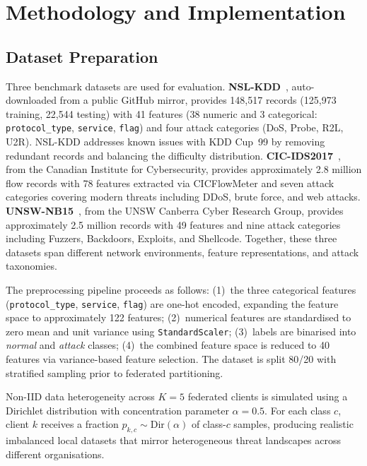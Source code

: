 \documentclass[conference]{IEEEtran}
\begin{document}
\section{Methodology and Implementation}

\subsection{Dataset Preparation}

Three benchmark datasets are used for evaluation.
\textbf{NSL-KDD}~\cite{tavallaee2009}, auto-downloaded from a public GitHub
mirror, provides 148,517 records (125,973 training, 22,544 testing) with
41 features (38 numeric and 3 categorical: \texttt{protocol\_type},
\texttt{service}, \texttt{flag}) and four attack categories (DoS, Probe,
R2L, U2R). NSL-KDD addresses known issues with KDD Cup~99 by removing
redundant records and balancing the difficulty distribution.
\textbf{CIC-IDS2017}~\cite{sharafaldin2018}, from the Canadian Institute for Cybersecurity,
provides approximately 2.8 million flow records with 78 features extracted
via CICFlowMeter and seven attack categories covering modern threats
including DDoS, brute force, and web attacks.
\textbf{UNSW-NB15}~\cite{moustafa2015}, from the UNSW Canberra Cyber Research Group,
provides approximately 2.5 million records with 49 features and nine
attack categories including Fuzzers, Backdoors, Exploits, and Shellcode.
Together, these three datasets span different network environments,
feature representations, and attack taxonomies.

The preprocessing pipeline proceeds as follows:
(1)~the three categorical features (\texttt{protocol\_type},
\texttt{service}, \texttt{flag}) are one-hot encoded, expanding the
feature space to approximately 122 features;
(2)~numerical features are standardised to zero mean and unit
variance using \texttt{StandardScaler};
(3)~labels are binarised into \textit{normal} and \textit{attack}
classes;
(4)~the combined feature space is reduced to 40 features via
variance-based feature selection.
The dataset is split 80/20 with stratified sampling prior to
federated partitioning.

Non-IID data heterogeneity across $K=5$ federated clients is
simulated using a Dirichlet distribution with concentration parameter
$\alpha=0.5$.
For each class $c$, client $k$ receives a fraction
$p_{k,c} \sim \text{Dir}(\alpha)$ of class-$c$ samples, producing
realistic imbalanced local datasets that mirror heterogeneous threat
landscapes across different organisations.
\end{document}
